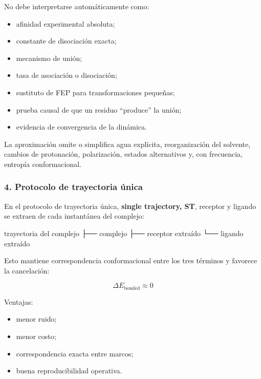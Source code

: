 \documentclass[
  spanish,
  11pt,
  a4paper]{article}
\newenvironment{Shaded}{\begin{snugshade}}{\end{snugshade}}
\newcommand{\NormalTok}[1]{#1}
\providecommand{\tightlist}{%
  \setlength{\itemsep}{0pt}\setlength{\parskip}{0pt}}
\begin{document}
No debe interpretarse automáticamente como:

\begin{itemize}
\tightlist
\item
  afinidad experimental absoluta;
\item
  constante de disociación exacta;
\item
  mecanismo de unión;
\item
  tasa de asociación o disociación;
\item
  sustituto de FEP para transformaciones pequeñas;
\item
  prueba causal de que un residuo ``produce'' la unión;
\item
  evidencia de convergencia de la dinámica.
\end{itemize}

La aproximación omite o simplifica agua explícita, reorganización del
solvente, cambios de protonación, polarización, estados alternativos y,
con frecuencia, entropía conformacional.

\subsubsection{4. Protocolo de trayectoria
única}\label{protocolo-de-trayectoria-uxfanica}

En el protocolo de trayectoria única, \textbf{single trajectory, ST},
receptor y ligando se extraen de cada instantánea del complejo:

\begin{Shaded}
\begin{Highlighting}[]
\NormalTok{trayectoria del complejo}
\NormalTok{        ├── complejo}
\NormalTok{        ├── receptor extraído}
\NormalTok{        └── ligando extraído}
\end{Highlighting}
\end{Shaded}

Esto mantiene correspondencia conformacional entre los tres términos y
favorece la cancelación:

\[
\Delta E_{\mathrm{bonded}}\approx0
\]

Ventajas:

\begin{itemize}
\tightlist
\item
  menor ruido;
\item
  menor costo;
\item
  correspondencia exacta entre marcos;
\item
  buena reproducibilidad operativa.
\end{itemize}
\end{document}
